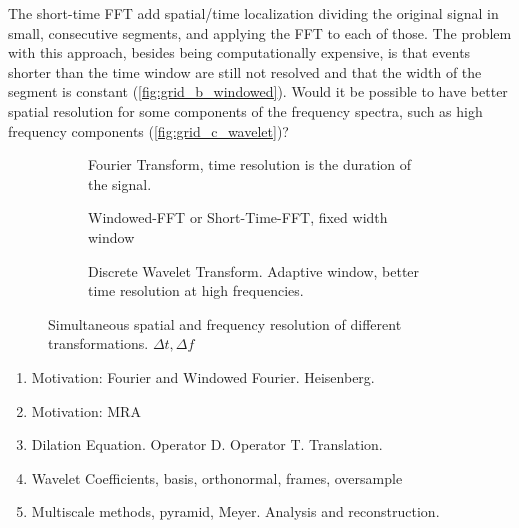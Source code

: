 \documentclass{InsightArticle}
\theoremstyle{definition}
\begin{document}
The short-time FFT add spatial/time localization dividing the original signal in small, consecutive segments, and applying the FFT to each of those. The problem with this approach, besides being computationally expensive, is that events shorter than the time window are still not resolved and that the width of the segment is constant (\autoref{fig:grid_b_windowed}). Would it be possible to have better spatial resolution for some components of the frequency spectra, such as high frequency components (\autoref{fig:grid_c_wavelet})?

\begin{figure}[H]
  \begin{subfigure}[t]{.33\textwidth}
    \centering
    
    \captionsetup{width=0.8\textwidth}
    \caption{Fourier Transform, time resolution is the duration of the signal.}
    \label{fig:grid_a_fft}
  \end{subfigure}
  \begin{subfigure}[t]{.33\textwidth}
    \centering
    
    \captionsetup{width=0.8\textwidth}
    \caption{Windowed-FFT or Short-Time-FFT, fixed width window}
    \label{fig:grid_b_windowed}
  \end{subfigure}
  \begin{subfigure}[t]{.33\textwidth}
    \centering
    
    \captionsetup{width=0.8\textwidth}
    \caption{Discrete Wavelet Transform. Adaptive window, better time resolution at high frequencies.}
    \label{fig:grid_c_wavelet}
  \end{subfigure}
  \caption{Simultaneous spatial and frequency resolution of different transformations. $\Delta t, \Delta f$}
  \label{fig:grids}
\end{figure}

\begin{enumerate}
  \item Motivation: Fourier and Windowed Fourier. Heisenberg.
  \item Motivation: MRA
  \item Dilation Equation. Operator D.  Operator T. Translation.
  \item Wavelet Coefficients, basis, orthonormal, frames, oversample
  \item Multiscale methods, pyramid, Meyer. Analysis and reconstruction.
\end{enumerate}

\end{document}
